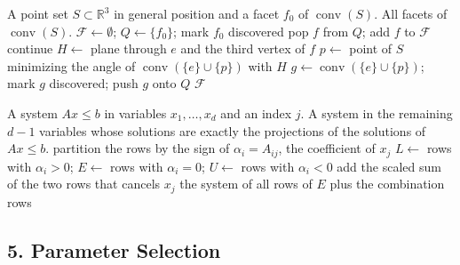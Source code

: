 \begin{algorithm}[htbp]
\caption{Gift Wrapping in 3D}
\label{alg:polytopes_gift_wrapping}
\begin{algorithmic}[1]
\Require A point set $S \subset \mathbb{R}^3$ in general position and a facet $f_0$ of $\operatorname{conv}(S)$.
\Ensure All facets of $\operatorname{conv}(S)$.
  \State $\mathcal{F} \gets \emptyset$; $Q \gets \{ f_0 \}$; mark $f_0$ discovered
    \State pop $f$ from $Q$; add $f$ to $\mathcal{F}$
        \State continue  
      \EndIf
      \State $H \gets$ plane through $e$ and the third vertex of $f$
      \State $p \gets$ point of $S$ minimizing the angle of $\operatorname{conv}(\{e\} \cup \{p\})$ with $H$
      \State $g \gets \operatorname{conv}(\{e\} \cup \{p\})$; mark $g$ discovered; push $g$ onto $Q$
    \EndFor
  \EndWhile
  \State \Return $\mathcal{F}$
\EndFunction
\end{algorithmic}
\end{algorithm}

\begin{algorithm}[htbp]
\caption{Fourier--Motzkin Elimination of One Variable}
\label{alg:polytopes_fourier_motzkin}
\begin{algorithmic}[1]
\Require A system $Ax \le b$ in variables $x_1, \dots, x_d$ and an index $j$.
\Ensure A system in the remaining $d-1$ variables whose solutions are exactly the projections of the solutions of $Ax \le b$.
  \State partition the rows by the sign of $\alpha_i = A_{ij}$, the coefficient of $x_j$
  \State $L \gets$ rows with $\alpha_i > 0$; $E \gets$ rows with $\alpha_i = 0$; $U \gets$ rows with $\alpha_i < 0$
    \State add the scaled sum of the two rows that cancels $x_j$
  \EndFor
  \State \Return the system of all rows of $E$ plus the combination rows
\EndFunction
\end{algorithmic}
\end{algorithm}

\subsection{5. Parameter Selection}

